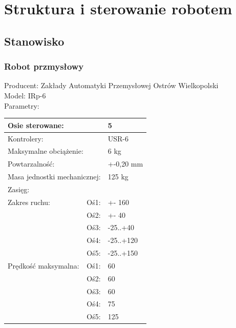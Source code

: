 \chapter{Struktura i sterowanie robotem}
\label{cha:strukturaISterowanie}

\section{Stanowisko}
\label{sec:stanowisko}

\subsection{Robot przmysłowy}
\label{sebsec:RobotPrzemyslowy}
\noindent Producent: Zakłady Automatyki Przemysłowej Ostrów Wielkopolski\\
Model: IRp-6\\
Parametry:\\
\begin{tabular}{|l|l|l|} \hline
\multicolumn{2}{|l|}{Osie sterowane: }& {5} \\ \hline
\multicolumn{2}{|l|}{Kontrolery: }& {USR-6}\\ \hline
\multicolumn{2}{|l|}{Maksymalne obciążenie: } & {6 kg}\\ \hline
\multicolumn{2}{|l|}{Powtarzalność: }& {+-0,20 mm}\\ \hline
\multicolumn{2}{|l|}{Masa jednostki mechanicznej: }& {125 kg}\\ \hline
\multicolumn{2}{|l|}{Zasięg: }& \\ \hline
{Zakres ruchu:} & {Oś1:} & {+- 160} \\ \cline{2-3}
& Oś2: & +- 40 \\ \cline{2-3}
& Oś3: & -25..+40\\ \cline{2-3}
& Oś4: & -25..+120\\ \cline{2-3}
& Oś5: & -25..+150\\ \hline
Prędkość maksymalna: & Oś1: & 60 \\ \cline{2-3}
& Oś2: & 60 \\ \cline{2-3}
& Oś3: & 60 \\ \cline{2-3}
& Oś4: & 75 \\ \cline{2-3}
& Oś5: & 125\\ \hline
\end{tabular}

